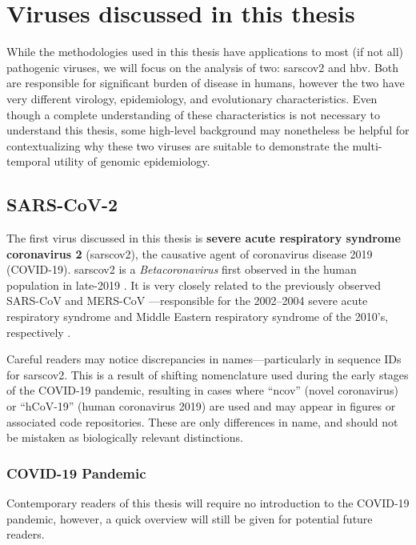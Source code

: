 \section{Viruses discussed in this thesis}
While the methodologies used in this thesis have applications to most (if not all) pathogenic viruses, we will focus on the analysis of two: \gls{sarscov2} and \gls{hbv}.
Both are responsible for significant burden of disease in humans, however the two have very different virology, epidemiology, and evolutionary characteristics.
Even though a complete understanding of these characteristics is not necessary to understand this thesis, some high-level background may nonetheless be helpful for contextualizing why these two viruses are suitable to demonstrate the multi-temporal utility of genomic epidemiology.

\subsection{SARS-CoV-2}
The first virus discussed in this thesis is \textbf{severe acute respiratory syndrome coronavirus 2} (\gls{sarscov2}), the causative agent of coronavirus disease 2019 (COVID-19).
\gls{sarscov2} is a \textit{Betacoronavirus} first observed in the human population in late-2019 \citep{zhou2020pneumonia}.
It is very closely related to the previously observed SARS-CoV and MERS-CoV \citep{abdelrahman2020comparative}---responsible for the 2002--2004 severe acute respiratory syndrome and Middle Eastern respiratory syndrome of the 2010's, respectively \citep{gorbalenya2020species}.

Careful readers may notice discrepancies in names---particularly in sequence IDs for \gls{sarscov2}.
This is a result of shifting nomenclature used during the early stages of the COVID-19 pandemic, resulting in cases where ``ncov'' (novel coronavirus) \citep{lancet2020emerging} or ``hCoV-19'' (human coronavirus 2019) \citep{sun2020structural} are used and may appear in figures or associated code repositories.
These are only differences in name, and should not be mistaken as biologically relevant distinctions.

\subsubsection{COVID-19 Pandemic}
Contemporary readers of this thesis will require no introduction to the COVID-19 pandemic, however, a quick overview will still be given for potential future readers.

